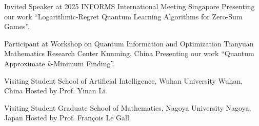 \documentclass[11pt,a4paper,sans]{moderncv}   %
\begin{document}
{Invited Speaker at 2025 INFORMS International Meeting}
{}
{Singapore}
{}
{Presenting our work ``Logarithmic-Regret Quantum Learning Algorithms for Zero-Sum Games''.}

{Participant at Workshop on Quantum Information and Optimization}
{Tianyuan Mathematics Research Center}
{Kunming, China}
{}
{Presenting our work ``Quantum Approximate $k$-Minimum Finding''.}


{Visiting Student}
{School of Artificial Intelligence, Wuhan University}
{Wuhan, China}
{}
{Hosted by Prof. Yinan Li.}

{Visiting Student}
{Graduate School of Mathematics, Nagoya University}
{Nagoya, Japan}
{}
{Hosted by Prof. Fran\c{c}ois Le Gall.}




\end{document}
